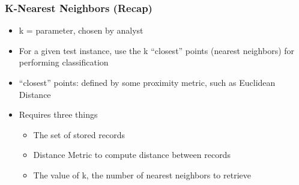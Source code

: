%
%
%
%

\begin{frame}[fragile]\frametitle{K-Nearest Neighbors (Recap)}
\begin{itemize}
\item k = parameter, chosen by analyst
\item For a given test instance, use the k ``closest'' points (nearest neighbors) for performing classification
\item ``closest'' points: defined by some proximity metric, such as Euclidean Distance
\item Requires three things
	\begin{itemize}
	\item The set of stored records
	\item Distance Metric to compute distance between records
	\item The value of k, the number of nearest neighbors to retrieve
	\end{itemize}
\end{itemize}
\end{frame}

